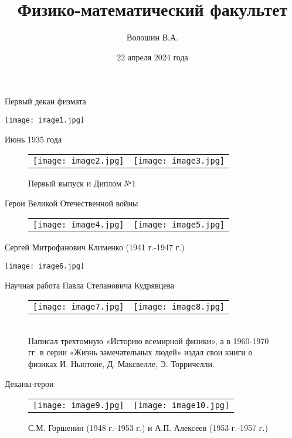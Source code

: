\documentclass[pdf,hyperref={unicode}, aspectratio=43, serif,11pt]{beamer}
\title[физмат]{Физико-математический факультет}
\author{Волошин В.А.}
\date{22 апреля 2024 года}
\institute[]{Орловский государственный
университет имени И.\,С.~Тургенева}
\begin{document}
\begin{frame}
\titlepage{}
\end{frame}
\begin{frame}{Первый декан физмата}
    \begin{center}
        \texttt{[image: image1.jpg]}
    \end{center}
\end{frame}
\begin{frame}{Июнь 1935 года}
    \begin{figure}[h]
        \begin{tabular}{ll}
            \texttt{[image: image2.jpg]}
            &
            \texttt{[image: image3.jpg]}
        \end{tabular}
        \caption{Первый выпуск и Диплом №1}
        \label{Fig:Race}
    \end{figure}
\end{frame}
\begin{frame}{Герои Великой Отечественной войны}
    \begin{figure}[h]
        \begin{tabular}{ll}
            \texttt{[image: image4.jpg]}
            &
            \texttt{[image: image5.jpg]}
        \end{tabular}
        \label{Fig:Race}
    \end{figure}
\end{frame}
\begin{frame}{Сергей Митрофанович Клименко (1941 г.-1947 г.)}
    \begin{center}
        \texttt{[image: image6.jpg]}
    \end{center}
\end{frame}
\begin{frame}{Научная работа Павла Степановича Кудрявцева}
    \begin{figure}[h]
        \begin{tabular}{ll}
            \texttt{[image: image7.jpg]}
            &
            \texttt{[image: image8.jpg]}
        \end{tabular} \\
        Написал трехтомную «Историю всемирной физики», а в 1960-1970 гг. в серии «Жизнь замечательных людей» издал свои книги о физиках И. Ньютоне, Д. Максвелле, Э. Торричелли.
        \label{Fig:Race}
    \end{figure}
\end{frame}
\begin{frame}{Деканы-герои}
    \begin{figure}[h]
        \begin{tabular}{ll}
            \texttt{[image: image9.jpg]}
            &
            \texttt{[image: image10.jpg]}
        \end{tabular}
        \label{Fig:Race}
        \caption{С.М. Горшенин (1948 г.-1953 г.) и А.П. Алексеев (1953 г.-1957 г.)}
    \end{figure}
\end{frame}
\end{document}

